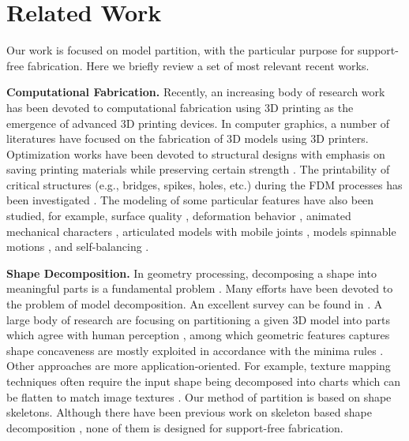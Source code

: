 \section{Related Work}

Our work is focused on model partition, with the particular purpose for support-free fabrication. Here we briefly review a set of most relevant recent works.

\textbf{Computational Fabrication.} Recently, an increasing body of research work has been devoted to computational fabrication using 3{D} printing as the emergence of advanced 3{D} printing devices. In computer graphics, a number of literatures have focused on the fabrication of 3{D} models using 3{D} printers. Optimization works have been devoted to structural designs with emphasis on saving printing materials while preserving certain strength \cite{StavaVBCM12,ZhouPZ13,WangWYLTTDCL13,Umetani:2013:CSA,wang2013cost,LuSZWFCSTCC14,hornus2015tight,xie2017support}. The printability of critical structures (e.g., bridges, spikes, holes, etc.) during the FDM processes has been investigated \cite{telea2011voxel,DumasHL14}. The modeling of some particular features have also been studied, for example, surface quality \cite{wang2016improved}, deformation behavior \cite{SkourasTCBG13}, animated mechanical characters \cite{CorosTNSFSMB13,CeylanLMAP13}, articulated models with mobile joints \cite{BacherBJP12,CaliCAKSKW12}, models spinnable motions \cite{Bacher14}, and self-balancing \cite{PrevostWLS13}.

\textbf{Shape Decomposition.} In geometry processing, decomposing a shape into meaningful parts is a fundamental problem \cite{Kaick:2014:SSA}. Many efforts have been devoted to the problem of model decomposition. An excellent survey can be found in \cite{Shamir08}. A large body of research are focusing on partitioning a given 3{D} model into parts which agree with human perception \cite{KatzT03,KatzLT05,JiLCW06,LiuZ07,Golovinskiy:2008,ChenGF09,KaickFKAC14}, among which geometric features captures shape concaveness are mostly exploited in accordance with the minima rules \cite{hoffman1984parts,hoffman1997salience}. Other approaches are more application-oriented. For example, texture mapping techniques often require the input shape being decomposed into charts which can be flatten to match image textures \cite{zhou2004iso,Garcia:2008:IIG}. Our method of partition is based on shape skeletons. Although there have been previous work on skeleton based shape decomposition \cite{lien2006simultaneous,reniers2007skeleton,AuTCCL08}, none of them is designed for support-free fabrication.


